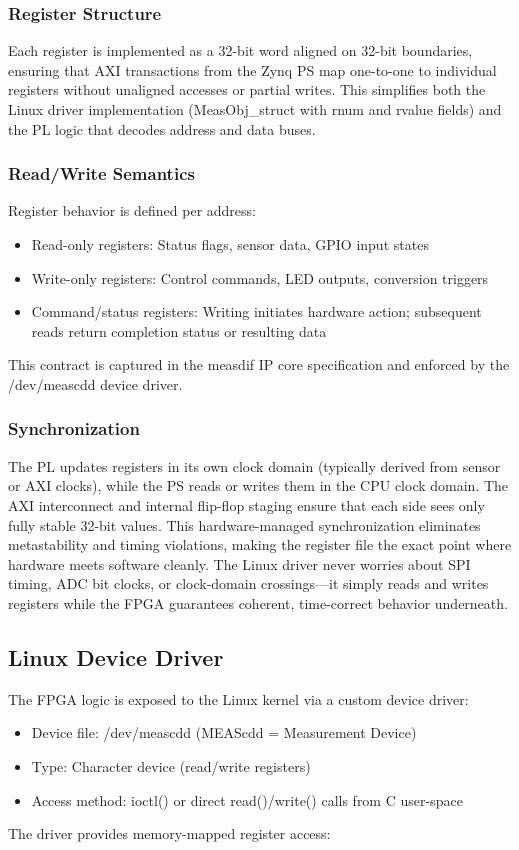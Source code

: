 \subsubsection{Register Structure}
Each register is implemented as a 32-bit word aligned on 32-bit boundaries, ensuring that AXI transactions from the Zynq PS map one-to-one to individual registers without unaligned accesses or partial writes. This simplifies both the Linux driver implementation (MeasObj\_struct with rnum and rvalue fields) and the PL logic that decodes address and data buses.
	
\subsubsection{Read/Write Semantics}
Register behavior is defined per address:

\begin{itemize}
	\item Read-only registers: Status flags, sensor data, GPIO input states
	\item Write-only registers: Control commands, LED outputs, conversion triggers
	\item Command/status registers: Writing initiates hardware action; subsequent reads return completion status or resulting data
\end{itemize}
This contract is captured in the measdif IP core specification and enforced by the /dev/meascdd device driver.

\subsubsection{Synchronization}
The PL updates registers in its own clock domain (typically derived from sensor or AXI clocks), while the PS reads or writes them in the CPU clock domain. The AXI interconnect and internal flip-flop staging ensure that each side sees only fully stable 32-bit values. This hardware-managed synchronization eliminates metastability and timing violations, making the register file the exact point where hardware meets software cleanly. The Linux driver never worries about SPI timing, ADC bit clocks, or clock-domain crossings—it simply reads and writes registers while the FPGA guarantees coherent, time-correct behavior underneath.

\subsection{Linux Device Driver}
The FPGA logic is exposed to the Linux kernel via a custom device driver:
\begin{itemize}
	\item Device file: /dev/meascdd (MEAScdd = Measurement Device)
	\item Type: Character device (read/write registers)
	\item Access method: ioctl() or direct read()/write() calls from C user-space
\end{itemize}
The driver provides memory-mapped register access:

